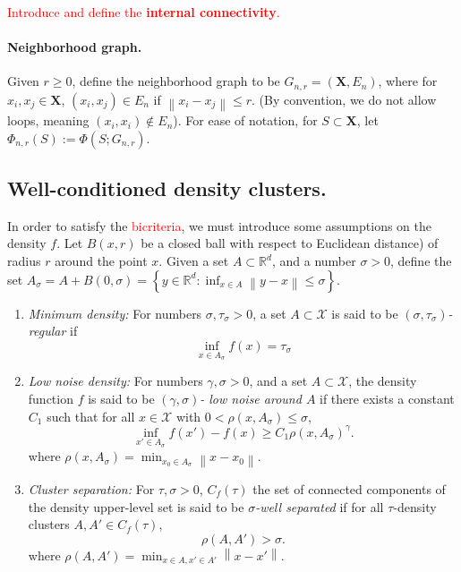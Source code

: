 \documentclass{article}
\newcommand{\diam}{\mathrm{diam}}
\newcommand{\set}[1]{\left\{#1\right\}}
\newcommand{\Reals}{\mathbb{R}}
\newcommand{\Rd}{\Reals^d}
\newcommand{\norm}[1]{\left\lVert#1\right\rVert}
\newcommand{\Asig}{A_{\sigma}}
\theoremstyle{aldenthm}
\theoremstyle{remark}
\begin{document}
\textcolor{red}{Introduce and define the \textbf{internal connectivity}.}

\paragraph{Neighborhood graph.}

Given $r \geq 0$, define the neighborhood graph to be $G_{n,r} = (\mathbf{X}, E_n)$, where for $x_i, x_j \in \mathbf{X}$, $(x_i, x_j) \in E_n$ if $\norm{x_i - x_j} \leq r$. (By convention, we do not allow loops, meaning $(x_i, x_i) \not\in E_n$). For ease of notation, for $S \subset \mathbf{X}$, let $\Phi_{n,r}(S) := \Phi(S; G_{n,r})$.

\subsection{Well-conditioned density clusters.}

In order to satisfy the \textcolor{red}{bicriteria}, we must introduce some assumptions on the density $f$. Let $B(x,r)$ be a closed ball with respect to Euclidean distance) of radius $r$ around the point $x$.  Given a set $A \subset \Rd$, and a number $\sigma > 0$, define the set $\Asig = A + B(0,\sigma) = \set{y \in \Rd: \inf_{x \in A} \norm{y - x} \leq \sigma}$. 
\begin{enumerate}[label=(A\arabic*)]
	\item 
	\label{asmp: cluster_regularity}
	\textit{Minimum density:} For numbers $\sigma, \tau_{\sigma} > 0$, a set $A \subset \mathcal{X}$ is said to be \textit{$(\sigma, \tau_{\sigma})$-regular} if
	\begin{equation}
	\inf_{x \in \Asig} f(x) = \tau_{\sigma}
	\end{equation} 
	
	\item 
	\label{asmp: low_noise_density}
	\textit{Low noise density:} For numbers $\gamma, \sigma > 0$, and a set $A \subset \mathcal{X}$, the density function $f$ is said to be \textit{$(\gamma, \sigma)$- low noise around $A$} if there exists a constant $C_1$ such that for all $x \in \mathcal{X}$ with $0 < \rho(x, \Asig) \leq \sigma$,
	\begin{equation*}
	\inf_{x' \in \Asig} f(x') - f(x) \geq C_1 \rho(x, \Asig)^{\gamma}.
	\end{equation*}
	where $\rho(x,\Asig) = \min_{x_0 \in \Asig} \norm{x - x_0}$.
	
	\item
	\label{asmp: cluster_separation}
	\textit{Cluster separation:}
	For $\tau,\sigma > 0$, $C_f(\tau)$ the set of connected components of the density upper-level set is said to be \textit{$\sigma$-well separated} if for all $\tau$-density clusters $A, A' \in C_f(\tau)$,
	\begin{equation*}
	\rho(A,A') > \sigma.
	\end{equation*}
	where $\rho(A,A') = \min_{x \in A, x' \in A'} \norm{x - x'}$.
\end{enumerate}
\end{document}
